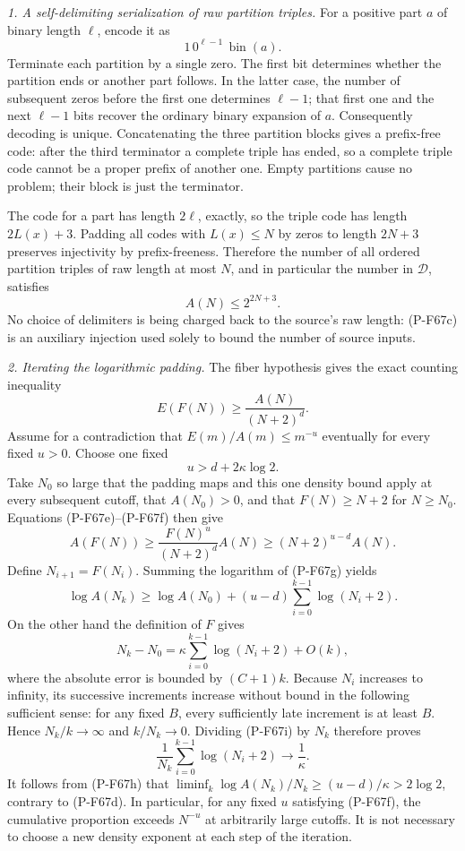 \emph{1. A self-delimiting serialization of raw partition triples.}
For a positive part $a$ of binary length $\ell$, encode it as
\[
             1\,0^{\ell-1}\,\operatorname{bin}(a).
 \tag{P-F67c}
\]
Terminate each partition by a single zero.  The first bit determines
whether the partition ends or another part follows.  In the latter
case, the number of subsequent zeros before the first one determines
$\ell-1$; that first one and the next $\ell-1$ bits recover the
ordinary binary expansion of $a$.  Consequently decoding is unique.
Concatenating the three partition blocks gives a prefix-free code:
after the third terminator a complete triple has ended, so a complete
triple code cannot be a proper prefix of another one.  Empty partitions
cause no problem; their block is just the terminator.

The code for a part has length $2\ell$, exactly, so the triple code
has length $2L(x)+3$.  Padding all codes with $L(x)\le N$ by zeros
to length $2N+3$ preserves injectivity by prefix-freeness.  Therefore
the number of all ordered partition triples of raw length at most
$N$, and in particular the number in $\mathcal D$, satisfies
\[
                         A(N)\le 2^{2N+3}.
 \tag{P-F67d}
\]
No choice of delimiters is being charged back to the source's raw
length: (P-F67c) is an auxiliary injection used solely to bound the
number of source inputs.

\emph{2. Iterating the logarithmic padding.}
The fiber hypothesis gives the exact counting inequality
\[
                    E(F(N))\ge\frac{A(N)}{(N+2)^d}.
 \tag{P-F67e}
\]
Assume for a contradiction that $E(m)/A(m)\le m^{-u}$ eventually
for every fixed $u>0$.  Choose one fixed
\[
                         u>d+2\kappa\log 2.
 \tag{P-F67f}
\]
Take $N_0$ so large that the padding maps and this one density
bound apply at every subsequent cutoff, that $A(N_0)>0$, and
that $F(N)\ge N+2$ for $N\ge N_0$.  Equations (P-F67e)--(P-F67f)
then give
\[
 A(F(N))\ge\frac{F(N)^u}{(N+2)^d}A(N)
             \ge (N+2)^{u-d}A(N).
 \tag{P-F67g}
\]
Define $N_{i+1}=F(N_i)$.  Summing the logarithm of (P-F67g) yields
\[
 \log A(N_k)\ge\log A(N_0)
                  +(u-d)\sum_{i=0}^{k-1}\log(N_i+2).
 \tag{P-F67h}
\]
On the other hand the definition of $F$ gives
\[
 N_k-N_0=\kappa\sum_{i=0}^{k-1}\log(N_i+2)+O(k),
 \tag{P-F67i}
\]
where the absolute error is bounded by $(C+1)k$.
Because $N_i$ increases to infinity, its successive increments
increase without bound in the following sufficient sense: for any
fixed $B$, every sufficiently late increment is at least $B$.
Hence $N_k/k\to\infty$ and $k/N_k\to0$.
Dividing (P-F67i) by $N_k$ therefore proves
\[
 \frac{1}{N_k}\sum_{i=0}^{k-1}\log(N_i+2)
                         \longrightarrow\frac1\kappa.
 \tag{P-F67j}
\]
It follows from (P-F67h) that
$\liminf_k\log A(N_k)/N_k\ge(u-d)/\kappa>2\log2$,
contrary to (P-F67d).  In particular, for any fixed $u$ satisfying
(P-F67f), the cumulative proportion exceeds $N^{-u}$ at arbitrarily
large cutoffs.  It is not necessary to choose a new density exponent
at each step of the iteration.

